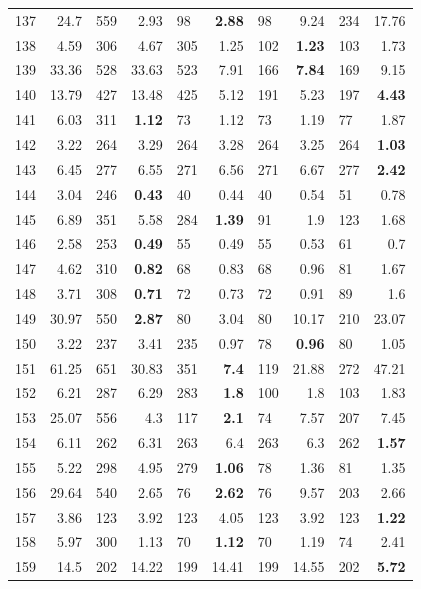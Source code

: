 \begin{longtable}{lr@{\hskip 4pt}l@{\hskip 12pt}r@{\hskip 4pt}l@{\hskip 12pt}r@{\hskip 4pt}l@{\hskip 12pt}r@{\hskip 4pt}l@{\hskip 12pt}r}
137 & 24.7 & 559 & 2.93 & 98 & \textbf{2.88} & 98 & 9.24 & 234 & 17.76 \\
138 & 4.59 & 306 & 4.67 & 305 & 1.25 & 102 & \textbf{1.23} & 103 & 1.73 \\
139 & 33.36 & 528 & 33.63 & 523 & 7.91 & 166 & \textbf{7.84} & 169 & 9.15 \\
140 & 13.79 & 427 & 13.48 & 425 & 5.12 & 191 & 5.23 & 197 & \textbf{4.43} \\
141 & 6.03 & 311 & \textbf{1.12} & 73 & 1.12 & 73 & 1.19 & 77 & 1.87 \\
142 & 3.22 & 264 & 3.29 & 264 & 3.28 & 264 & 3.25 & 264 & \textbf{1.03} \\
143 & 6.45 & 277 & 6.55 & 271 & 6.56 & 271 & 6.67 & 277 & \textbf{2.42} \\
144 & 3.04 & 246 & \textbf{0.43} & 40 & 0.44 & 40 & 0.54 & 51 & 0.78 \\
145 & 6.89 & 351 & 5.58 & 284 & \textbf{1.39} & 91 & 1.9 & 123 & 1.68 \\
146 & 2.58 & 253 & \textbf{0.49} & 55 & 0.49 & 55 & 0.53 & 61 & 0.7 \\
147 & 4.62 & 310 & \textbf{0.82} & 68 & 0.83 & 68 & 0.96 & 81 & 1.67 \\
148 & 3.71 & 308 & \textbf{0.71} & 72 & 0.73 & 72 & 0.91 & 89 & 1.6 \\
149 & 30.97 & 550 & \textbf{2.87} & 80 & 3.04 & 80 & 10.17 & 210 & 23.07 \\
150 & 3.22 & 237 & 3.41 & 235 & 0.97 & 78 & \textbf{0.96} & 80 & 1.05 \\
151 & 61.25 & 651 & 30.83 & 351 & \textbf{7.4} & 119 & 21.88 & 272 & 47.21 \\
152 & 6.21 & 287 & 6.29 & 283 & \textbf{1.8} & 100 & 1.8 & 103 & 1.83 \\
153 & 25.07 & 556 & 4.3 & 117 & \textbf{2.1} & 74 & 7.57 & 207 & 7.45 \\
154 & 6.11 & 262 & 6.31 & 263 & 6.4 & 263 & 6.3 & 262 & \textbf{1.57} \\
155 & 5.22 & 298 & 4.95 & 279 & \textbf{1.06} & 78 & 1.36 & 81 & 1.35 \\
156 & 29.64 & 540 & 2.65 & 76 & \textbf{2.62} & 76 & 9.57 & 203 & 2.66 \\
157 & 3.86 & 123 & 3.92 & 123 & 4.05 & 123 & 3.92 & 123 & \textbf{1.22} \\
158 & 5.97 & 300 & 1.13 & 70 & \textbf{1.12} & 70 & 1.19 & 74 & 2.41 \\
159 & 14.5 & 202 & 14.22 & 199 & 14.41 & 199 & 14.55 & 202 & \textbf{5.72} \\

\end{longtable}
